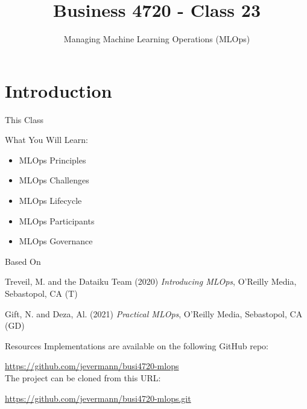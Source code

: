 \documentclass[ignorenonframetext,xcolor=x11names]{beamer}
\title{Business 4720 - Class 23}
\subtitle{Managing Machine Learning Operations (MLOps)}
\begin{document}
\begin{frame}[label=full]{}
  \titlepage
  \footnotesize
  
\end{frame}

\section{Introduction}

\begin{frame}[label=full]{This Class}

\begin{block}{What You Will Learn:}
\begin{itemize}
  \item MLOps Principles
  \item MLOps Challenges
  \item MLOps Lifecycle
  \item MLOps Participants
  \item MLOps Governance
\end{itemize}
\end{block}
\end{frame}

\begin{frame}[label=full]{Based On}
\begin{block}{}
Treveil, M. and the Dataiku Team (2020) \emph{Introducing MLOps}, O'Reilly Media, Sebastopol, CA (T) \\
\end{block}

\begin{block}{}
Gift, N. and Deza, Al. (2021) \emph{Practical MLOps}, O'Reilly Media, Sebastopol, CA (GD) \\
\end{block}
\end{frame}

\begin{frame}[label=withcode]{Resources}
Implementations are available on the following GitHub repo:

\small\url{https://github.com/jevermann/busi4720-mlops}\normalsize \\


The project can be cloned from this URL:

\small\url{https://github.com/jevermann/busi4720-mlops.git}\normalsize
\end{frame}
\end{document}
